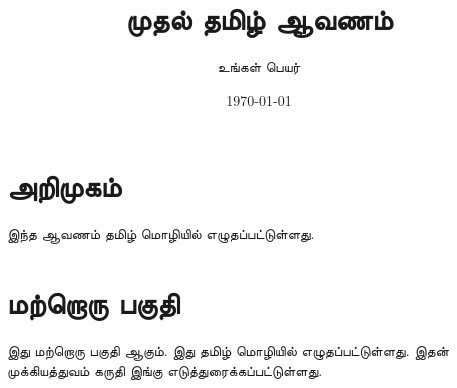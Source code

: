 \documentclass{article}
\begin{document}
\title{முதல் தமிழ் ஆவணம்}
\author{உங்கள் பெயர்}
\date{\today}

\maketitle

\section{அறிமுகம்}
இந்த ஆவணம் தமிழ் மொழியில் எழுதப்பட்டுள்ளது.

\section{மற்றொரு பகுதி}
இது மற்றொரு பகுதி ஆகும். இது தமிழ் மொழியில் எழுதப்பட்டுள்ளது. இதன் முக்கியத்துவம் கருதி இங்கு எடுத்துரைக்கப்பட்டுள்ளது.
\end{document}
